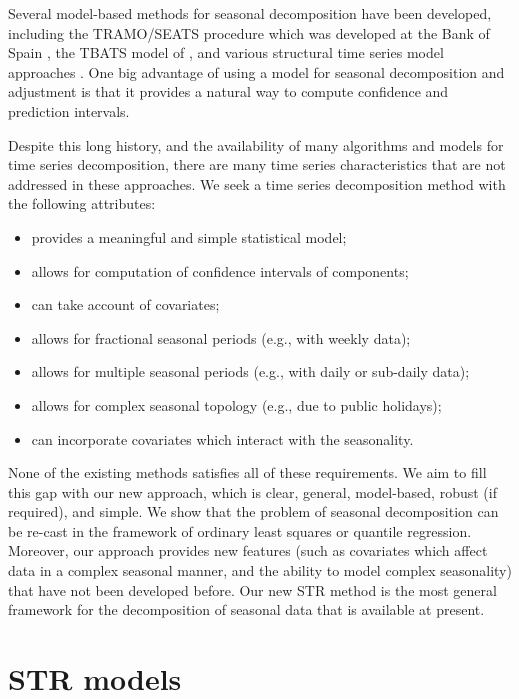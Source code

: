 \documentclass[ijds,nonblindrev]{informs-ijds}
\providecommand{\tightlist}{%
  \setlength{\itemsep}{0pt}\setlength{\parskip}{0pt}}
\begin{document}
Several model-based methods for seasonal decomposition have been developed, including the TRAMO/SEATS procedure which was developed at the Bank of Spain \citep{Gomez2001}, the TBATS model of \citet{de2011forecasting}, and various structural time series model approaches \citep{harvey1990forecasting,Commandeur2011}. One big advantage of using a model for seasonal decomposition and adjustment is that it provides a natural way to compute confidence and prediction intervals.

Despite this long history, and the availability of many algorithms and models for time series decomposition, there are many time series characteristics that are not addressed in these approaches. We seek a time series decomposition method with the following attributes:

\begin{itemize}
\tightlist
\item
  provides a meaningful and simple statistical model;
\item
  allows for computation of confidence intervals of components;
\item
  can take account of covariates;
\item
  allows for fractional seasonal periods (e.g., with weekly data);
\item
  allows for multiple seasonal periods (e.g., with daily or sub-daily data);
\item
  allows for complex seasonal topology (e.g., due to public holidays);
\item
  can incorporate covariates which interact with the seasonality.
\end{itemize}

None of the existing methods satisfies all of these requirements. We aim to fill this gap with our new approach, which is clear, general, model-based, robust (if required), and simple. We show that the problem of seasonal decomposition can be re-cast in the framework of ordinary least squares or quantile regression. Moreover, our approach provides new features (such as covariates which affect data in a complex seasonal manner, and the ability to model complex seasonality) that have not been developed before. Our new STR method is the most general framework for the decomposition of seasonal data that is available at present.

\hypertarget{str-models}{%
\section{STR models}\label{str-models}}
\end{document}
